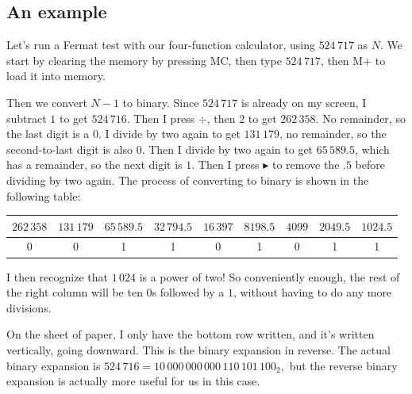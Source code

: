 \documentclass[11pt,paper=letter]{scrartcl}
\begin{document}
\subsection{An example}

Let's run a Fermat test with our four-function calculator, using $524\,717$ as $N$. We start by clearing the memory by pressing MC, then type $524\,717$, then M+ to load it into memory.

Then we convert $N-1$ to binary. Since $524\,717$ is already on my screen, I subtract $1$ to get $524\,716$. Then I press $\div$, then $2$ to get $262\,358$. No remainder, so the last digit is a $0$. I divide by two again to get $131\,179$, no remainder, so the second-to-last digit is also $0$. Then I divide by two again to get $65\,589.5$, which has a remainder, so the next digit is $1$. Then I press $\blacktriangleright$ to remove the $.5$ before dividing by two again. The process of converting to binary is shown in the following table:
\begin{center}
  \begin{tabular}{ccccccccc}
    $262\,358$ & $131\,179$ & $65\,589.5$  & $32\,794.5$  & $16\,397$  & $8198.5$   & $4099$   & $2049.5$ & $1024.5$ \\ \hline
    0 & 0 & 1 & 1 & 0 & 1 & 0 & 1 & 1
  \end{tabular}
\end{center}
I then recognize that $1\,024$ is a power of two! So conveniently enough, the rest of the right column will be ten $0$s followed by a $1$, without having to do any more divisions.

On the sheet of paper, I only have the bottom row written, and it's written vertically, going downward. This is the binary expansion in reverse. The actual binary expansion is $524\,716 = 10\,000\,000\,000\,110\,101\,100_2,$ but the reverse binary expansion is actually more useful for us in this case.
\end{document}
